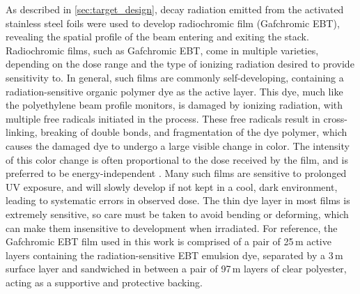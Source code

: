 As described in \autoref{sec:target_design}, decay radiation emitted from the activated stainless steel foils were used to develop radiochromic film (Gafchromic EBT), revealing the spatial profile of the beam entering and exiting the stack.
Radiochromic films, such as Gafchromic EBT, come in multiple varieties, depending on the   dose range and the type of ionizing radiation desired to provide sensitivity to. 
In general, such films are commonly self-developing, containing a radiation-sensitive organic polymer dye as the active layer.
This dye, much like the polyethylene beam profile monitors, is damaged by ionizing radiation, with multiple free radicals initiated in the process.
These free radicals result in cross-linking, breaking of double bonds, and fragmentation of the dye polymer, which causes the damaged dye to undergo a large visible change in  color.
The intensity of this color change is often proportional to the dose received by the film, and is preferred to be energy-independent \cite{Azam1998}.
Many such films are sensitive to prolonged UV exposure, and will slowly develop if not kept in a  cool, dark environment, leading to systematic errors in observed dose.
The thin dye layer in most films is extremely sensitive, so care must be taken to avoid bending or deforming, which can make them insensitive to development when irradiated.
For reference, the Gafchromic EBT film used in this work is comprised of a pair of 25\,\mmicro m active layers containing the radiation-sensitive EBT emulsion dye, separated by a 3\,\mmicro m surface layer and sandwiched in between a pair of 97\,\mmicro m layers of clear polyester, acting as a supportive and protective backing. 






% 


